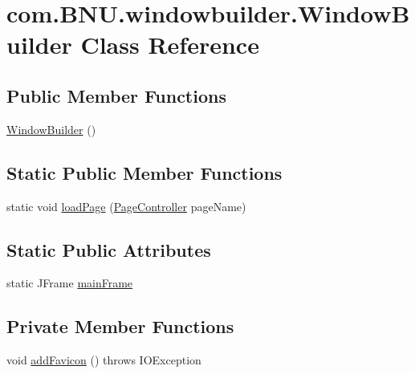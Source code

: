 \hypertarget{classcom_1_1_b_n_u_1_1windowbuilder_1_1_window_builder}{}\section{com.\+B\+N\+U.\+windowbuilder.\+Window\+Builder Class Reference}
\label{classcom_1_1_b_n_u_1_1windowbuilder_1_1_window_builder}
\subsection*{Public Member Functions}
\begin{DoxyCompactItemize}
\item 
\mbox{\hyperlink{classcom_1_1_b_n_u_1_1windowbuilder_1_1_window_builder_ad04792ea904860f3a355ec6db3d8e977}{Window\+Builder}} ()
\end{DoxyCompactItemize}
\subsection*{Static Public Member Functions}
\begin{DoxyCompactItemize}
\item 
static void \mbox{\hyperlink{classcom_1_1_b_n_u_1_1windowbuilder_1_1_window_builder_a06347b14f9e3a3395ffa1d0d5af63778}{load\+Page}} (\mbox{\hyperlink{classcom_1_1_b_n_u_1_1pages_1_1_page_controller}{Page\+Controller}} page\+Name)
\end{DoxyCompactItemize}
\subsection*{Static Public Attributes}
\begin{DoxyCompactItemize}
\item 
static J\+Frame \mbox{\hyperlink{classcom_1_1_b_n_u_1_1windowbuilder_1_1_window_builder_af0148dc0b3c6767fe5bd67a28b05579b}{main\+Frame}}
\end{DoxyCompactItemize}
\subsection*{Private Member Functions}
\begin{DoxyCompactItemize}
\item 
void \mbox{\hyperlink{classcom_1_1_b_n_u_1_1windowbuilder_1_1_window_builder_a551d16c8923a0c3769b28d6b4a3cccae}{add\+Favicon}} ()  throws I\+O\+Exception 
\end{DoxyCompactItemize}
